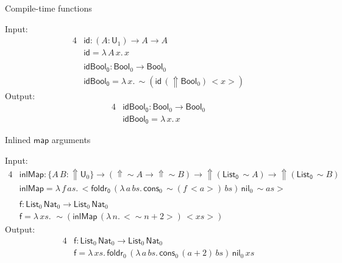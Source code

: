 \documentclass[dvipsnames]{beamer}
\renewcommand{\mit}[1]{\mathit{#1}}
\newcommand{\msf}[1]{\mathsf{#1}}
\newcommand{\Lift}{{\Uparrow}}
\newcommand{\spl}{{\sim}}
\newcommand{\qut}[1]{{<}#1{>}}
\newcommand{\U}{\msf{U}}
\newcommand{\Bool}{\msf{Bool}}
\newcommand{\List}{\msf{List}}
\newcommand{\nil}{\msf{nil}}
\newcommand{\cons}{\msf{cons}}
\newcommand{\Nat}{\msf{Nat}}
\newcommand{\id}{\msf{id}}
\theoremstyle{remark}
\begin{document}
\begin{frame}{Compile-time functions}

Input:
\begin{alignat*}{4}
  & \id : (A : \U_1) \to A \to A\\
  & \id = \lambda\,A\,x.\,x     \\
  & \\
  & \msf{idBool_0} : \Bool_0 \to \Bool_0\\
  & \msf{idBool_0} = \lambda\,x.\,\spl(\id\,(\Lift \Bool_0)\,\qut{x})
\end{alignat*}
\pause
Output:
\begin{alignat*}{4}
  & \msf{idBool_0} : \Bool_0 \to \Bool_0\\
  & \msf{idBool_0} = \lambda\,x.\,x
\end{alignat*}

\end{frame}


\begin{frame}{Inlined $\msf{map}$ arguments}

Input:
\begin{alignat*}{4}
  & \msf{inlMap} : \{A\,B : \Lift \U_0\} \to (\Lift\spl A \to \Lift\spl B) \to \Lift(\msf{List_0}\,\spl A) \to \Lift(\msf{List_0}\,\spl B) \\
  & \msf{inlMap} = \lambda\,f\,\mit{as}.\,\qut{\msf{foldr_0}\,
    (\lambda\,a\,\mit{bs}.\,\cons_0\,\spl(f\,\qut{a})\,\mit{bs})\,
    \nil_0\,
    \spl{\mit{as}}
    }\\
  & \\
  & \msf{f} : \List_0\,\Nat_0 \to \List_0\,\Nat_0\\
  & \msf{f} = \lambda\,\mit{xs}.\,\,\spl(\msf{inlMap}\,(\lambda\,n.\,\qut{\spl n + 2})
     \,\qut{\mit{xs}})
\end{alignat*}
\pause
Output:
\begin{alignat*}{4}
  & \msf{f} : \List_0\,\Nat_0 \to \List_0\,\Nat_0\\
  & \msf{f} = \lambda\,\mit{xs}.\, \msf{foldr}_0\,(\lambda\,a\,\mit{bs}.\,\cons_0\,(a + 2)\,\mit{bs})\,\nil_0\,\mit{xs}
\end{alignat*}

\end{frame}
\end{document}
